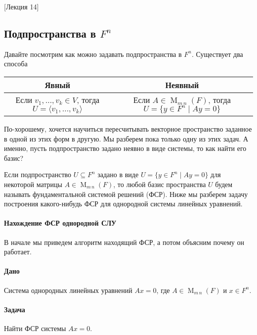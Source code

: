 [Лекция 14]


\subsection{Подпространства в $F^n$}
\label{section::Subspaces}

Давайте посмотрим как можно задавать подпространства в $F^n$.
Существует два способа
\vspace{3pt}

\begin{tabular}{c|c}
{\bf Явный}&{\bf Неявный}\\
\hline
{Если $v_1,\ldots,v_k\in V$, тогда $U = \langle v_1,\ldots, v_k \rangle$}&{Если $A\in \operatorname{M}_{m\,n}(F)$, тогда $U = \{y\in F^n \mid Ay = 0\}$}\\
\end{tabular}
\vspace{3pt}

По-хорошему, хочется научиться пересчитывать векторное пространство заданное в одной из этих форм в другую.
Мы разберем пока только одну из этих задач.
А именно, пусть подпространство задано неявно в виде системы, то как найти его базис?

Если подпространство $U\subseteq F^n$ задано в виде $U = \{y\in F^n\mid Ay = 0\}$ для некоторой матрицы $A\in\operatorname{M}_{m\,n}(F)$, то любой базис пространства $U$ будем называть фундаментальной системой решений (ФСР).
Ниже мы разберем задачу построения какого-нибудь ФСР для однородной системы линейных уравнений.

\paragraph{Нахождение ФСР однородной СЛУ}

В начале мы приведем алгоритм находящий ФСР, а потом объясним почему он работает.

\paragraph{Дано}

Система однородных линейных уравнений $Ax = 0$, где $A\in \operatorname{M}_{m\,n}(F)$ и $x\in F^n$.

\paragraph{Задача}

Найти ФСР системы $Ax = 0$.


